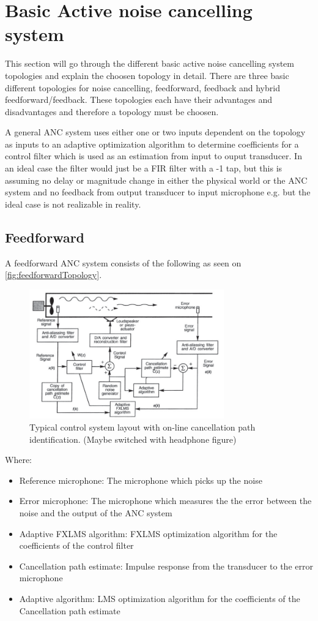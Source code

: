 \section{Basic Active noise cancelling system} \label{sec:BasicSystem}
This section will go through the different basic active noise cancelling system topologies and explain the choosen topology in detail. There are three basic different topologies for noise cancelling, feedforward, feedback and hybrid feedforward/feedback. These topologies each have their advantages and disadvantages and therefore a topology must be choosen.

A general ANC system uses either one or two inputs dependent on the topology as inputs to an adaptive optimization algorithm to determine coefficients for a control filter which is used as an estimation from input to ouput transducer. In an ideal case the filter would just be a FIR filter with a -1 tap, but this is assuming no delay or magnitude change in either the physical world or the ANC system and no feedback from output transducer to input microphone e.g. but the ideal case is not realizable in reality. 



\subsection*{Feedforward}
A feedforward ANC system consists of the following as seen on \autoref{fig:feedforwardTopology}.
\begin{figure}[H]
	\centering
	\includegraphics[width=0.75\textwidth]{figures/BasicSystem/feedforward}
	\caption{Typical control system layout with on-line cancellation path identification. (Maybe switched with headphone figure)}
	\label{fig:feedforwardTopology}
\end{figure}
Where:
\begin{itemize}
\item Reference microphone: The microphone which picks up the noise 
\item Error microphone: The microphone which measures the the error between the noise and the output of the ANC system
\item Adaptive FXLMS algorithm: FXLMS optimization algorithm for the coefficients of the control filter
\item Cancellation path estimate: Impulse response from the transducer to the error microphone
\item Adaptive algorithm: LMS optimization algorithm for the coefficients of the Cancellation path estimate 
\end{itemize}

